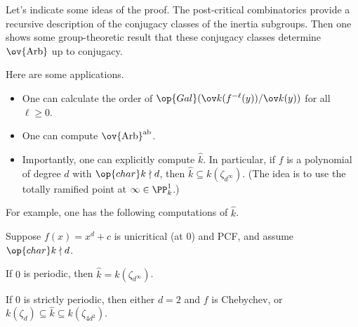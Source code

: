 \documentclass{article}
\begin{document}
\begin{remark}
	Let's indicate some ideas of the proof. The post-critical combinatorics provide a recursive description of the conjugacy classes of the inertia subgroups. Then one shows some group-theoretic result that these conjugacy classes determine $\ov{\mathrm{Arb}}$ up to conjugacy.
\end{remark}
Here are some applications.
\begin{itemize}
	\item One can calculate the order of $\op{Gal}(\ov k(f^{-\ell}(y))/\ov k(y))$ for all $\ell\ge0$.
	\item One can compute $\ov{\mathrm{Arb}}^{\mathrm{ab}}$.
	\item Importantly, one can explicitly compute $\widehat k$. In particular, if $f$ is a polynomial of degree $d$ with $\op{char}k\nmid d$, then $\widehat k\subseteq k(\zeta_{d^\infty})$. (The idea is to use the totally ramified point at $\infty\in\PP^1_k$.)
\end{itemize}
For example, one has the following computations of $\widehat k$.
\begin{theorem}
	Suppose $f(x)=x^d+c$ is unicritical (at $0$) and PCF, and assume $\op{char}k\nmid d$.
	\begin{listalph}
		\item If $0$ is periodic, then $\widehat k=k(\zeta_{d^\infty})$.
		\item If $0$ is strictly periodic, then either $d=2$ and $f$ is Chebychev, or $k(\zeta_d)\subseteq\widehat k\subseteq k(\zeta_{4d^2})$.
	\end{listalph}
\end{theorem}
\end{document}

